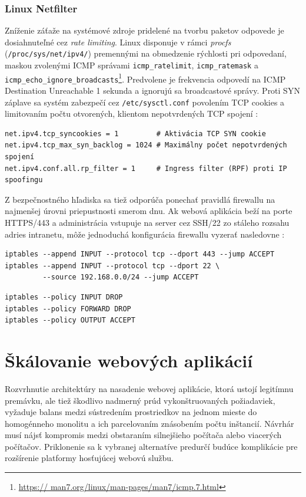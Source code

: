 \documentclass[12pt, a4paper]{article}
\begin{document}
\subsubsection{Linux Netfilter}
Zníženie záťaže na systémové zdroje pridelené na tvorbu paketov odpovede je dosiahnuteľné cez 
\emph{rate limiting}. Linux disponuje v rámci \emph{procfs} (\verb|/proc/sys/net/ipv4/|) premennými 
na obmedzenie rýchlosti pri odpovedaní, maskou zvolenými ICMP správami \verb|icmp_ratelimit|, 
\verb|icmp_ratemask| a \verb|icmp_echo_ignore_broadcasts|\footnote{\url{https://
man7.org/linux/man-pages/man7/icmp.7.html}}. Predvolene je frekvencia odpovedí na 
ICMP Destination Unreachable 1 sekunda a ignorujú sa broadcastové správy. Proti SYN záplave sa
systém zabezpečí cez \verb|/etc/sysctl.conf| povolením TCP cookies a limitovaním
počtu otvorených, klientom nepotvrdených TCP spojení \cite{haproxy-ddos}:
\begin{lstlisting}
net.ipv4.tcp_syncookies = 1         # Aktivácia TCP SYN cookie
net.ipv4.tcp_max_syn_backlog = 1024 # Maximálny počet nepotvrdených spojení
net.ipv4.conf.all.rp_filter = 1     # Ingress filter (RPF) proti IP spoofingu  
\end{lstlisting}

Z bezpečnostného hľadiska sa tiež odporúča ponechať pravidlá firewallu na najmenšej úrovni priepustnosti 
smerom dnu. Ak webová aplikácia beží na porte HTTPS/443 a 
administrácia vstupuje na server cez SSH/22 zo stáleho rozsahu adries intranetu, môže jednoduchá 
konfigurácia firewallu vyzerať nasledovne \cite{csirt-hardening}:
\begin{lstlisting}[caption=Pravidlá pre povolenie prichádzajúcej komunikácie cez SSH a HTTPS]
iptables --append INPUT --protocol tcp --dport 443 --jump ACCEPT
iptables --append INPUT --protocol tcp --dport 22 \ 
         --source 192.168.0.0/24 --jump ACCEPT
\end{lstlisting}

\begin{lstlisting}[caption=Politiky reťazí pravidiel sú zahodiť všetko okrem odchádzajúcich paketov]
iptables --policy INPUT DROP
iptables --policy FORWARD DROP
iptables --policy OUTPUT ACCEPT
\end{lstlisting}

\section{Škálovanie webových aplikácií}
Rozvrhnutie architektúry na nasadenie webovej aplikácie, ktorá ustojí legitímnu premávku, ale tiež 
škodlivo nadmerný prúd vykonštruovaných požiadaviek, vyžaduje balans medzi sústredením prostriedkov na 
jednom mieste do homogénneho monolitu a ich parcelovaním znásobením počtu inštancií. Návrhár musí 
nájsť kompromis medzi obstaraním silnejšieho počítača alebo viacerých počítačov. Priklonenie 
sa k vybranej alternatíve predurčí budúce komplikácie pre rozšírenie platformy hosťujúcej webovú 
službu. 
\end{document}
